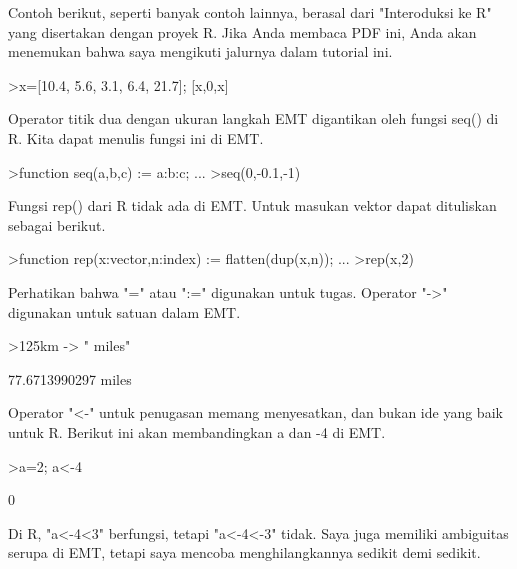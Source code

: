 \documentclass[a4paper,10pt]{article}
\begin{document}
\begin{eulernotebook}
\begin{eulercomment}
\begin{eulercomment}
\begin{eulercomment}
Contoh berikut, seperti banyak contoh lainnya, berasal dari
"Interoduksi ke R" yang disertakan dengan proyek R. Jika Anda membaca
PDF ini, Anda akan menemukan bahwa saya mengikuti jalurnya dalam
tutorial ini.
\end{eulercomment}
\begin{eulerprompt}
>x=[10.4, 5.6, 3.1, 6.4, 21.7]; [x,0,x]
\end{eulerprompt}
\begin{euleroutput}
  [10.4,  5.6,  3.1,  6.4,  21.7,  0,  10.4,  5.6,  3.1,  6.4,  21.7]
\end{euleroutput}
\begin{eulercomment}
Operator titik dua dengan ukuran langkah EMT digantikan oleh fungsi
seq() di R. Kita dapat menulis fungsi ini di EMT.
\end{eulercomment}
\begin{eulerprompt}
>function seq(a,b,c) := a:b:c; ...
>seq(0,-0.1,-1)
\end{eulerprompt}
\begin{euleroutput}
  [0,  -0.1,  -0.2,  -0.3,  -0.4,  -0.5,  -0.6,  -0.7,  -0.8,  -0.9,  -1]
\end{euleroutput}
\begin{eulercomment}
Fungsi rep() dari R tidak ada di EMT. Untuk masukan vektor dapat
dituliskan sebagai berikut.
\end{eulercomment}
\begin{eulerprompt}
>function rep(x:vector,n:index) := flatten(dup(x,n)); ...
>rep(x,2)
\end{eulerprompt}
\begin{euleroutput}
  [10.4,  5.6,  3.1,  6.4,  21.7,  10.4,  5.6,  3.1,  6.4,  21.7]
\end{euleroutput}
\begin{eulercomment}
Perhatikan bahwa "=" atau ":=" digunakan untuk tugas. Operator "-\textgreater{}"
digunakan untuk satuan dalam EMT.
\end{eulercomment}
\begin{eulerprompt}
>125km -> " miles"
\end{eulerprompt}
\begin{euleroutput}
  77.6713990297 miles
\end{euleroutput}
\begin{eulercomment}
Operator "\textless{}-" untuk penugasan memang menyesatkan, dan bukan ide yang
baik untuk R. Berikut ini akan membandingkan a dan -4 di EMT.
\end{eulercomment}
\begin{eulerprompt}
>a=2; a<-4
\end{eulerprompt}
\begin{euleroutput}
  0
\end{euleroutput}
\begin{eulercomment}
Di R, "a\textless{}-4\textless{}3" berfungsi, tetapi "a\textless{}-4\textless{}-3" tidak. Saya juga memiliki
ambiguitas serupa di EMT, tetapi saya mencoba menghilangkannya sedikit
demi sedikit.


\end{eulercomment}
\end{eulercomment}
\end{eulercomment}
\end{eulernotebook}
\end{document}
